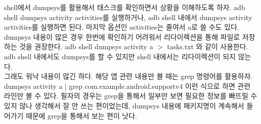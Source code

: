 shell에서 dumpsys를 활용해서 태스크를 확인하면서 상황을 이해하도록 하자.
adb shell dumpsys activity activities를 실행하거나, adb shell 내에서 dumpsys activity activities를 실행하면 된다. 마지막 옵션인 activities는 줄여서 a로 쓸 수도 있다.\\

dumpsys 내용이 많은 경우 한번에 확인하기 어려워서 리다이렉션을 통해 파일로 저장하는 것을 권장한다. adb shell dumpsys activity a  $>$ tasks.txt 와 같이 사용한다. adb shell 내에서도 dumpsys를 할 수 있지만 shell 내에서는 리다이렉션이 되지 않는다.\\

그래도 워낙 내용이 많긴 하다. 해당 앱 관련 내용만 볼 때는 grep 명령어를 활용하자. dumpsys activity a | grep com.example.android.supportv4 이런 식으로 하면 관련 라인만 볼 수 있다. 
필자의 경우는 grep을 통해서 일부만 보면 필요한 정보를 빠뜨릴 수 있지 않나 생각해서 잘 안 쓰는 편이었는데, dumpsys 내용에 패키지명이 계속해서 들어가기 때문에 grep을 통해서 보는 편이 낫다.\\

